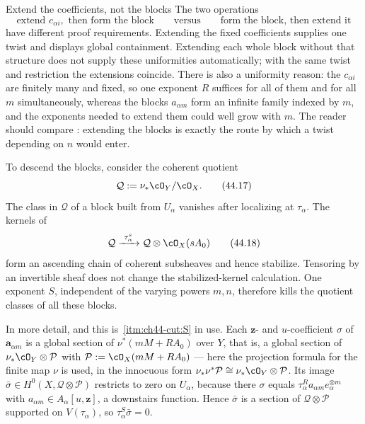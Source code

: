 \begin{warning}{Extend the coefficients, not the blocks}
\label{warn:ch44-extend-coefficients}
The two operations
\[
 \text{extend }c_{\alpha i},\text{ then form the block}
 \qquad\text{versus}\qquad
 \text{form the block, then extend it}
\]
have different proof requirements.  Extending the fixed coefficients
supplies one twist and displays global containment.  Extending each
whole block without that structure does not supply these uniformities
automatically; with the same twist and restriction the extensions
coincide.  There is also a uniformity reason: the $c_{\alpha i}$ are finitely many and fixed,
so one exponent $R$ suffices for all of them and for all $m$
simultaneously, whereas the blocks $a_{\alpha m}$ form an infinite family
indexed by $m$, and the exponents needed to extend them could well grow
with $m$.  The reader should compare
: extending the blocks is exactly the route by
which a twist depending on $n$ would enter.
\end{warning}

To descend the blocks, consider the coherent quotient
\[
            \mathcal Q:=\nu_*\cO_Y/\cO_X.
\tag{44.17}\label{eq:bj-char-zero-quotient}
\]
The class in $\mathcal Q$ of a block built from $U_\alpha$ vanishes after
localizing at $\tau_\alpha$.
The kernels of
\[
 \mathcal Q\xrightarrow{\ \tau_\alpha^s\ }
       \mathcal Q\otimes\cO_X(sA_0)
\tag{44.18}\label{eq:bj-char-zero-stable-kernels}
\]
form an ascending chain of coherent subsheaves and hence stabilize.
Tensoring by an invertible sheaf does not change the stabilized-kernel
calculation.
One exponent $S$, independent of the varying powers $m,n$, therefore
kills the quotient classes of all these blocks.

In more detail, and this is
\,\cref{itm:ch44-cut:S} in use.  Each
$\mathbf z$- and $u$-coefficient $\sigma$ of $\mathbf a_{\alpha m}$
is a global section of $\nu^*(mM+RA_0)$ over $Y$, that is, a global
section of $\nu_*\cO_Y\otimes\mathcal P$ with
$\mathcal P:=\cO_X(mM+RA_0)$ --- here the projection formula for the
finite map $\nu$ is used, in the innocuous form
$\nu_*\nu^*\mathcal P\cong\nu_*\cO_Y\otimes\mathcal P$.  Its image
$\bar\sigma\in H^0(X,\mathcal Q\otimes\mathcal P)$ restricts to zero on
$U_\alpha$, because there $\sigma$ equals
$\tau_\alpha^Ra_{\alpha m}e_\alpha^{\otimes m}$ with
$a_{\alpha m}\in A_\alpha[u,\mathbf z]$, a downstairs function.  Hence
$\bar\sigma$ is a section of $\mathcal Q\otimes\mathcal P$ supported on
$V(\tau_\alpha)$, so $\tau_\alpha^S\bar\sigma=0$.

